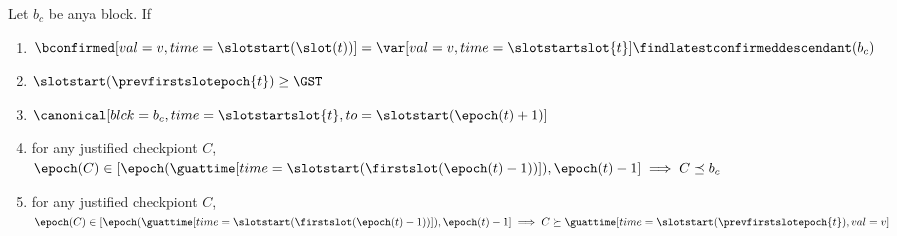 \documentclass{article}
\begin{document}
\begin{lemma}\label{lem:output-find-latest-canonical-canonical-at-the-start-of-an-epoch}
    Let $b_c$ be anya block.
    If
    \begin{enumerate}
        \item $\bconfirmed[val=v,time=\slotstart(\slot(t))] =  \var[val=v,time=\slotstartslot{t}]{\findlatestconfirmeddescendant}(b_c)$
        \item $\slotstart(\prevfirstslotepoch{t})\geq \GST$
        \item $\canonical[blck=b_c,time={\slotstartslot{t}},to=\slotstart(\epoch(t)+1)]$
        \item \label{itm:lem:output-find-latest-canonical-canonical-at-the-start-of-an-epoch:4}for any justified checkpiont $C$, $\epoch(C) \in [\epoch(\guattime[time=\slotstart(\firstslot(\epoch(t)-1))]),\epoch(t)-1] \implies C  \preceq b_c$
        \item  \label{itm:lem:output-find-latest-canonical-canonical-at-the-start-of-an-epoch:5} for any justified checkpiont $C$, $\epoch(C) \in [\epoch(\guattime[time=\slotstart(\firstslot(\epoch(t)-1))]),\epoch(t)-1] \implies C  \succeq \guattime[time=\slotstart(\prevfirstslotepoch{t}),val=v]$


\end{enumerate}
\end{lemma}
\end{document}
